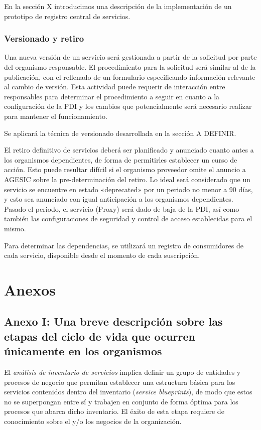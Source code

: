\documentclass[11pt]{article}
\begin{document}
				En la sección X introducimos una descripción de la implementación de un prototipo de registro central de servicios.

			\subsubsection{Versionado y retiro}
				Una nueva versión de un servicio será gestionada a partir de la solicitud por parte del organismo responsable. El procedimiento para la solicitud será similar al de la publicación, con el rellenado de un formulario especificando información relevante al cambio de versión. Esta actividad puede requerir de interacción entre responsables para determinar el procedimiento a seguir en cuanto a la configuración de la PDI y los cambios que potencialmente será necesario realizar para mantener el funcionamiento.

				Se aplicará la técnica de versionado desarrollada en la sección A DEFINIR.

				El retiro definitivo de servicios deberá ser planificado y anunciado cuanto antes a los organismos dependientes, de forma de permitirles establecer un curso de acción. Esto puede resultar difícil si el organismo proveedor omite el anuncio a AGESIC sobre la pre-determinación del retiro. Lo ideal será considerado que un servicio se encuentre en estado «deprecated» por un periodo no menor a 90 días, y esto sea anunciado con igual anticipación a los organismos dependientes. Pasado el periodo, el servicio (Proxy) será dado de baja de la PDI, así como también las configuraciones de seguridad y control de acceso establecidas para el mismo.

				Para determinar las dependencias, se utilizará un registro de consumidores de cada servicio, disponible desde el momento de cada suscripción.


	\section{Anexos}
		\subsection{Anexo I: Una breve descripción sobre las etapas del ciclo de vida que ocurren únicamente en los organismos}
			\label{sec:anexo1}
			El \emph{análisis de inventario de servicios} implica definir un grupo de entidades y procesos de negocio que permitan establecer una estructura básica para los servicios contenidos dentro del inventario (\emph{service blueprints}), de modo que estos no se superpongan entre sí y trabajen en conjunto de forma óptima para los procesos que abarca dicho inventario. El éxito de esta etapa requiere de conocimiento sobre el y/o los negocios de la organización.
\end{document}
